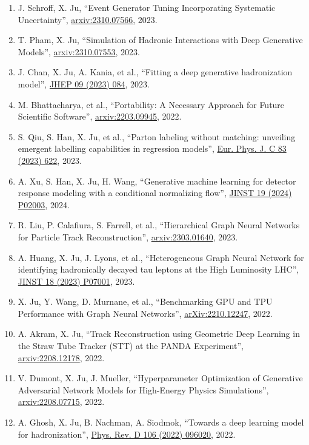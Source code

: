 \begin{enumerate}
\item J. Schroff, X. Ju, ``Event Generator Tuning Incorporating Systematic Uncertainty'', \href{https://arxiv.org/abs/2310.07566}{arxiv:2310.07566}, 2023.
\item T. Pham, X. Ju, ``Simulation of Hadronic Interactions with Deep Generative Models'', \href{https://arxiv.org/abs/2310.07553}{arxiv:2310.07553}, 2023.
\item J. Chan, X. Ju, A. Kania, et al., ``Fitting a deep generative hadronization model'', \href{https://doi.org/10.1007/JHEP09(2023)084}{JHEP 09 (2023) 084}, 2023.
\item M. Bhattacharya, et al., ``Portability: A Necessary Approach for Future Scientific Software'', \href{https://arxiv.org/abs/2203.09945}{arxiv:2203.09945}, 2022.
\item S. Qiu, S. Han, X. Ju, et al., ``Parton labeling without matching: unveiling emergent labelling capabilities in regression models'', \href{https://doi.org/10.1140/epjc/s10052-023-11809-z}{Eur. Phys. J. C 83 (2023) 622}, 2023.
\item A. Xu, S. Han, X. Ju, H. Wang, ``Generative machine learning for detector response modeling with a conditional normalizing flow'', \href{https://doi.org/10.1088/1748-0221/19/02/P02003}{JINST 19 (2024) P02003}, 2024.
\item R. Liu, P. Calafiura, S. Farrell, et al., ``Hierarchical Graph Neural Networks for Particle Track Reconstruction'', \href{https://arxiv.org/abs/2303.01640}{arxiv:2303.01640}, 2023.
\item A. Huang, X. Ju, J. Lyons, et al., ``Heterogeneous Graph Neural Network for identifying hadronically decayed tau leptons at the High Luminosity LHC'', \href{https://doi.org/10.1088/1748-0221/18/07/P07001}{JINST 18 (2023) P07001}, 2023.
\item X. Ju, Y. Wang, D. Murnane, et al., ``Benchmarking GPU and TPU Performance with Graph Neural Networks'', \href{https://arxiv.org/abs/2210.12247}{arXiv:2210.12247}, 2022.
\item A. Akram, X. Ju, ``Track Reconstruction using Geometric Deep Learning in the Straw Tube Tracker (STT) at the PANDA Experiment'', \href{https://arxiv.org/abs/2208.12178}{arxiv:2208.12178}, 2022.
\item V. Dumont, X. Ju, J. Mueller, ``Hyperparameter Optimization of Generative Adversarial Network Models for High-Energy Physics Simulations'', \href{https://doi.org/10.21203/rs.3.rs-2181360/v1}{arxiv:2208.07715}, 2022.
\item A. Ghosh, X. Ju, B. Nachman, A. Siodmok, ``Towards a deep learning model for hadronization'', \href{https://doi.org/10.1103/PhysRevD.106.096020}{Phys. Rev. D 106 (2022) 096020}, 2022.

\end{enumerate}
